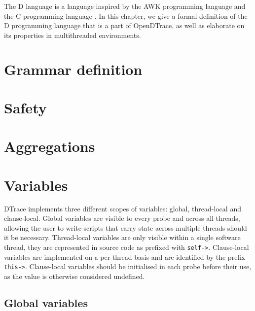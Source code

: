 The D language is a language inspired by the AWK programming language
\cite{Aho:1987:APL:29361} and the C programming language
\cite{Kernighan:1988}\cite{DTrace2004}. In this chapter, we give a
formal definition of the D programming language that is a part of
OpenDTrace, as well as elaborate on its properties in multithreaded
environments.

\section{Grammar definition}
\label{sec:grammar}


\section{Safety}
\label{sec:safety}


\section{Aggregations}
\label{sec:aggregations}


\section{Variables}
\label{sec:d-variables}
DTrace implements three different scopes of variables: global,
thread-local and clause-local. Global variables are visible to every
probe and across all threads, allowing the user to write scripts that
carry state across multiple threads should it be
necessary. Thread-local variables are only visible within a single
software thread, they are represented in source code as prefixed with
\texttt{self->}. Clause-local variables are implemented on a
per-thread basis and are identified by the prefix
\texttt{this->}. Clause-local variables should be initialised in each
probe before their use, as the value is otherwise considered
undefined.


\subsection{Global variables}

